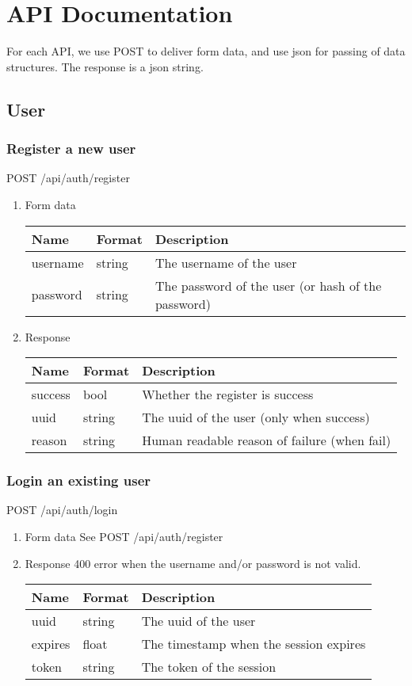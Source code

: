 \documentclass[11pt]{article}
\author{Jimmy Z}
\date{\today}
\title{}
\begin{document}
\tableofcontents

\section{API Documentation}
\label{sec:org7e75f92}
For each API, we use POST to deliver form data, and use json for passing of
data structures. The response is a json string.
\subsection{User}
\label{sec:org212e285}
\subsubsection{Register a new user}
\label{sec:org08d5444}
POST /api/auth/register
\begin{enumerate}
\item Form data
\label{sec:orge56f84a}
\begin{center}
\begin{tabular}{lll}
Name & Format & Description\\
\hline
username & string & The username of the user\\
password & string & The password of the user (or hash of the password)\\
\end{tabular}
\end{center}
\item Response
\label{sec:org9eda3b0}
\begin{center}
\begin{tabular}{lll}
Name & Format & Description\\
\hline
success & bool & Whether the register is success\\
uuid & string & The uuid of the user (only when success)\\
reason & string & Human readable reason of failure (when fail)\\
\end{tabular}
\end{center}
\end{enumerate}
\subsubsection{Login an existing user}
\label{sec:org8e0696c}
POST /api/auth/login
\begin{enumerate}
\item Form data
\label{sec:org253f954}
See POST /api/auth/register
\item Response
\label{sec:org50b6cc9}
400 error when the username and/or password is not valid.
\begin{center}
\begin{tabular}{lll}
Name & Format & Description\\
\hline
uuid & string & The uuid of the user\\
expires & float & The timestamp when the session expires\\
token & string & The token of the session\\
\end{tabular}
\end{center}
\end{enumerate}
\end{document}
